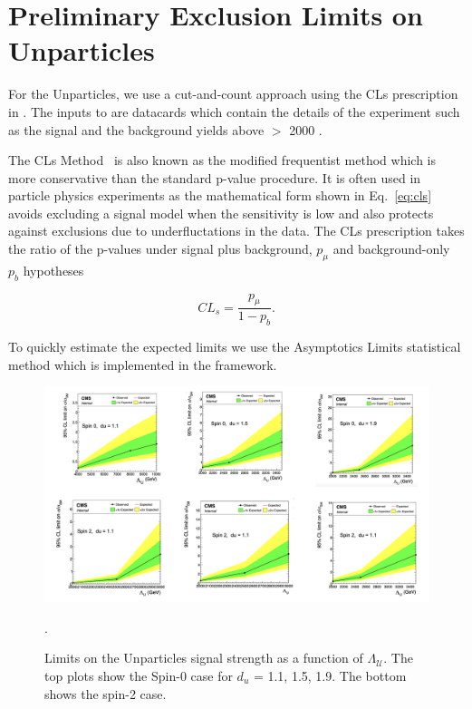 \section{Preliminary Exclusion Limits on Unparticles}

For the Unparticles, we use a cut-and-count approach using the CLs prescription in \COMBINE. The inputs to \COMBINE are datacards which contain the details of the experiment such as the signal and the background yields above \mgg $>$ 2000 \GeV. 

The CLs Method~\cite{Junk:1999kv, Read:2002hq} is also known as the modified frequentist method which is more conservative than the standard p-value procedure. It is often used in particle physics experiments as the mathematical form shown in Eq.~\ref{eq:cls} avoids excluding a signal model when the sensitivity is low and also protects against exclusions due to underfluctations in the data. The CLs prescription takes the ratio of the p-values under signal plus background, $p_\mu$ and background-only $p_b$ hypotheses

\begin{equation}
\label{eq:cls}
    CL_s = \frac{p_{\mu}}{1-p_b}.
\end{equation}

To quickly estimate the expected limits we use the Asymptotics Limits statistical method which is implemented in the \COMBINE framework. 

\begin{figure}[tbp!]
\includegraphics[angle=0,width=1\textwidth]{fig/UnparticlesCountingExperiment.png}
\caption{Limits on the Unparticles signal strength as a function of $\Lambda_{\mathcal{U}}$. The top plots show the Spin-0 case for $d_u$ = 1.1, 1.5, 1.9. The bottom shows the spin-2 case.}
\label{fig:UnparLimPlots}.
\end{figure}

